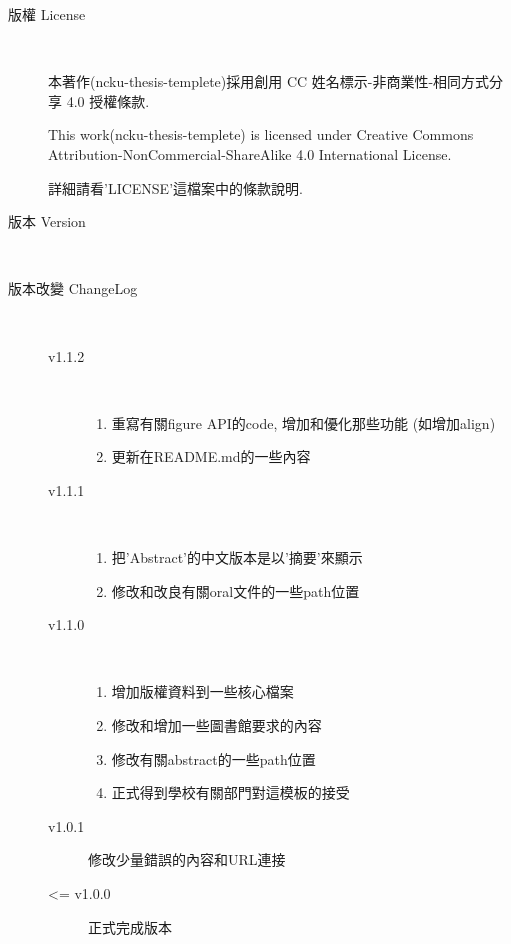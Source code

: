 \begin{description}
  \item[版權 License] \hfill \\

    本著作(ncku-thesis-templete)採用創用 CC 姓名標示-非商業性-相同方式分享 4.0 授權條款.

    This work(ncku-thesis-templete) is licensed under Creative Commons Attribution-NonCommercial-ShareAlike 4.0 International License.

  詳細請看'LICENSE'這檔案中的條款說明.

  \item[版本 Version] \hfill \\
    \ThisThesisVersion

  \item[版本改變 ChangeLog] \hfill \\
    \begin{description}
      \item[v1.1.2] \hfill \\
        \begin{enumerate}
          \item 重寫有關figure API的code, 增加和優化那些功能 (如增加align)
          \item 更新在README.md的一些內容
        \end{enumerate}

      \item[v1.1.1] \hfill \\
        \begin{enumerate}
          \item 把'Abstract'的中文版本是以'摘要'來顯示
          \item 修改和改良有關oral文件的一些path位置
        \end{enumerate}

      \item[v1.1.0] \hfill \\
        \begin{enumerate}
          \item 增加版權資料到一些核心檔案
          \item 修改和增加一些圖書館要求的內容
          \item 修改有關abstract的一些path位置
          \item 正式得到學校有關部門對這模板的接受
        \end{enumerate}

      \item[v1.0.1] 修改少量錯誤的內容和URL連接

      \item[<= v1.0.0] 正式完成版本
    \end{description}
\end{description}

\EndChapter
